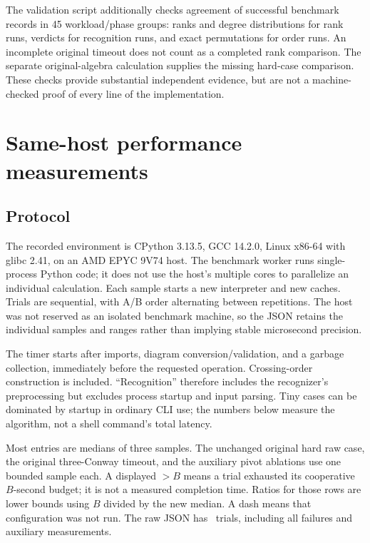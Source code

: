 \documentclass[11pt]{article}
\begin{document}
The validation script additionally checks agreement of successful benchmark
records in 45 workload/phase groups: ranks and degree distributions for rank
runs, verdicts for recognition runs, and exact permutations for order runs.
An incomplete original timeout does not count as a completed rank comparison.
The separate original-algebra calculation supplies the missing hard-case
comparison. These checks provide substantial independent evidence, but are
not a machine-checked proof of every line of the implementation.

\section{Same-host performance measurements}\label{sec:measurements}

\subsection{Protocol}

The recorded environment is CPython 3.13.5, GCC 14.2.0, Linux x86-64 with glibc
2.41, on an AMD EPYC 9V74 host. The benchmark worker runs single-process Python
code; it does not use the host's multiple cores to parallelize an individual
calculation. Each sample starts a new interpreter and new caches. Trials are
sequential, with A/B order alternating between repetitions. The host was not
reserved as an isolated benchmark machine, so the JSON retains the individual
samples and ranges rather than implying stable microsecond precision.

The timer starts after imports, diagram conversion/validation, and a garbage
collection, immediately before the requested operation. Crossing-order
construction is included. ``Recognition'' therefore includes the recognizer's
preprocessing but excludes process startup and input parsing. Tiny cases can
be dominated by startup in ordinary CLI use; the numbers below measure the
algorithm, not a shell command's total latency.

Most entries are medians of three samples. The unchanged original hard raw
case, the original three-Conway timeout, and the auxiliary pivot ablations use
one bounded sample each. A displayed $>B$ means a trial exhausted its
cooperative $B$-second budget; it is not a measured completion time. Ratios
for those rows are lower bounds using $B$ divided by the new median. A dash
means that configuration was not run. The raw JSON has \TrialCount\ trials,
including all failures and auxiliary measurements.
\end{document}
